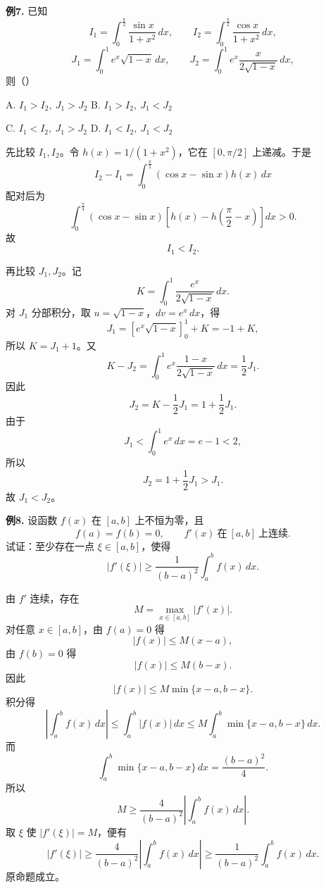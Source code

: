 \begin{problemblock}
\textbf{例7.} 已知
\[
I_1=\int_0^{\frac\pi2}\frac{\sin x}{1+x^2}\,dx,\qquad
I_2=\int_0^{\frac\pi2}\frac{\cos x}{1+x^2}\,dx,
\]
\[
J_1=\int_0^1 e^x\sqrt{1-x}\,dx,\qquad
J_2=\int_0^1 e^x\frac{x}{2\sqrt{1-x}}\,dx,
\]
则（\quad）

A. \(I_1>I_2,\ J_1>J_2\)\qquad
B. \(I_1>I_2,\ J_1<J_2\)

C. \(I_1<I_2,\ J_1>J_2\)\qquad
D. \(I_1<I_2,\ J_1<J_2\)
\end{problemblock}
\begin{solutionblock}
先比较 \(I_1,I_2\)。令 \(h(x)=1/(1+x^2)\)，它在 \([0,\pi/2]\) 上递减。于是
\[
I_2-I_1
=\int_0^{\frac\pi2}(\cos x-\sin x)h(x)\,dx
\]
配对后为
\[
\int_0^{\frac\pi4}(\cos x-\sin x)
\left[h(x)-h\left(\frac\pi2-x\right)\right]dx>0.
\]
故
\[
I_1<I_2.
\]

再比较 \(J_1,J_2\)。记
\[
K=\int_0^1\frac{e^x}{2\sqrt{1-x}}\,dx.
\]
对 \(J_1\) 分部积分，取 \(u=\sqrt{1-x}\)，\(dv=e^x\,dx\)，得
\[
J_1=\left[e^x\sqrt{1-x}\right]_0^1+K=-1+K,
\]
所以 \(K=J_1+1\)。又
\[
K-J_2=\int_0^1 e^x\frac{1-x}{2\sqrt{1-x}}\,dx
=\frac12J_1.
\]
因此
\[
J_2=K-\frac12J_1=1+\frac12J_1.
\]
由于
\[
J_1<\int_0^1 e^x\,dx=e-1<2,
\]
所以
\[
J_2=1+\frac12J_1>J_1.
\]
故 \(J_1<J_2\)。
\end{solutionblock}

\begin{problemblock}
\textbf{例8.} 设函数 \(f(x)\) 在 \([a,b]\) 上不恒为零，且
\[
f(a)=f(b)=0,\qquad f'(x)\ \text{在}\ [a,b]\ \text{上连续}.
\]
试证：至少存在一点 \(\xi\in[a,b]\)，使得
\[
|f'(\xi)|\ge
\frac1{(b-a)^2}\int_a^b f(x)\,dx.
\]
\end{problemblock}
\begin{solutionblock}
由 \(f'\) 连续，存在
\[
M=\max_{x\in[a,b]}|f'(x)|.
\]
对任意 \(x\in[a,b]\)，由 \(f(a)=0\) 得
\[
|f(x)|\le M(x-a),
\]
由 \(f(b)=0\) 得
\[
|f(x)|\le M(b-x).
\]
因此
\[
|f(x)|\le M\min\{x-a,b-x\}.
\]
积分得
\[
\left|\int_a^b f(x)\,dx\right|
\le\int_a^b|f(x)|\,dx
\le M\int_a^b\min\{x-a,b-x\}\,dx.
\]
而
\[
\int_a^b\min\{x-a,b-x\}\,dx=\frac{(b-a)^2}{4}.
\]
所以
\[
M\ge\frac{4}{(b-a)^2}\left|\int_a^b f(x)\,dx\right|.
\]
取 \(\xi\) 使 \(|f'(\xi)|=M\)，便有
\[
|f'(\xi)|\ge
\frac{4}{(b-a)^2}\left|\int_a^b f(x)\,dx\right|
\ge
\frac1{(b-a)^2}\int_a^b f(x)\,dx.
\]
原命题成立。
\end{solutionblock}

